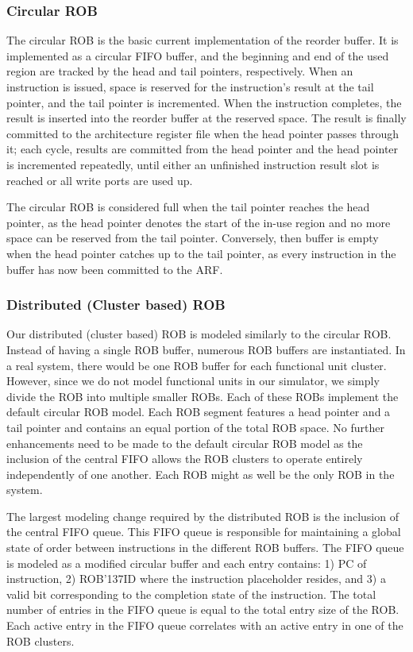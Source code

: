 \subsubsection{Circular ROB}
\label{sec:circ}
The circular ROB is the basic current implementation of the reorder buffer. It is implemented as a circular FIFO buffer, and the beginning and end of the used region are tracked by the head and tail pointers, respectively. When an instruction is issued, space is reserved for the instruction's result at the tail pointer, and the tail pointer is incremented. When the instruction completes, the result is inserted into the reorder buffer at the reserved space. The result is finally committed to the architecture register file when the head pointer passes through it; each cycle, results are committed from the head pointer and the head pointer is incremented repeatedly, until either an unfinished instruction result slot is reached or all write ports are used up.

The circular ROB is considered full when the tail pointer reaches the head pointer, as the head pointer denotes the start of the in-use region and no more space can be reserved from the tail pointer. Conversely, then buffer is empty when the head pointer catches up to the tail pointer, as every instruction in the buffer has now been committed to the ARF.

\subsubsection{Distributed (Cluster based) ROB}
Our distributed (cluster based) ROB is modeled similarly to the circular ROB.  Instead of having a single ROB buffer, numerous ROB buffers are instantiated.  In a real system, there would be one ROB buffer for each functional unit cluster.  However, since we do not model functional units in our simulator, we simply divide the ROB into multiple smaller ROBs.  Each of these ROBs implement the default circular ROB model.  Each ROB segment features a head pointer and a tail pointer and contains an equal portion of the total ROB space.  No further enhancements need to be made to the default circular ROB model as the inclusion of the central FIFO allows the ROB clusters to operate entirely independently of one another.  Each ROB might as well be the only ROB in the system.

The largest modeling change required by the distributed ROB is the inclusion of the central FIFO queue.  This FIFO queue is responsible for maintaining a global state of order between instructions in the different ROB buffers. The FIFO queue is modeled as a modified circular buffer and each entry contains: 1) PC of instruction, 2) ROB{\char'137}ID where the instruction placeholder resides, and 3) a valid bit corresponding to the completion state of the instruction.  The total number of entries in the FIFO queue is equal to the total entry size of the ROB.  Each active entry in the FIFO queue correlates with an active entry in one of the ROB clusters.

